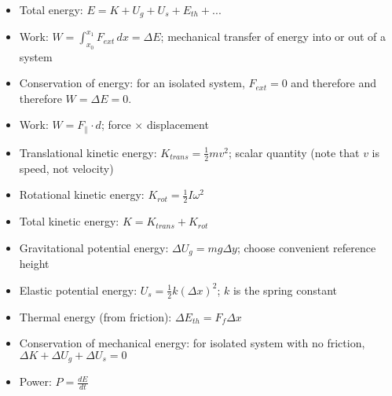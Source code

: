 \documentclass[11pt,letterpaper]{article}
\begin{document}
\begin{itemize}
\item Total energy: $E=K+U_g+U_s+E_{th}+...$
\item Work: $W=\displaystyle\int_{x_0}^{x_1}F_{ext}\,dx=\Delta{E}$; mechanical transfer of energy into or out of a system
\item Conservation of energy: for an isolated system, $F_{ext}=0$ and therefore and therefore $W=\Delta{E}=0$.
\item Work: $W=F_\parallel\cdot{d}$; force $\times$ displacement
\item Translational kinetic energy: $K_{trans}=\displaystyle\frac{1}{2}mv^2$; scalar quantity (note that $v$ is speed, not velocity)
\item Rotational kinetic energy: $K_{rot}=\displaystyle\frac{1}{2}I\omega^2$
\item Total kinetic energy: $K=K_{trans}+K_{rot}$
\item Gravitational potential energy: $\Delta{U_g}=mg\Delta{y}$; choose convenient reference height
\item Elastic potential energy: $U_s=\displaystyle\frac{1}{2}k(\Delta{x})^2$; $k$ is the spring constant
\item Thermal energy (from friction): $\Delta{E_{th}}=F_f\Delta{x}$
\item Conservation of mechanical energy: for isolated system with no friction, $\Delta{K}+\Delta{U_g}+\Delta{U_s}=0$
\item Power: $P=\displaystyle\frac{d{E}}{d{t}}$
\end{itemize}
\end{document}
